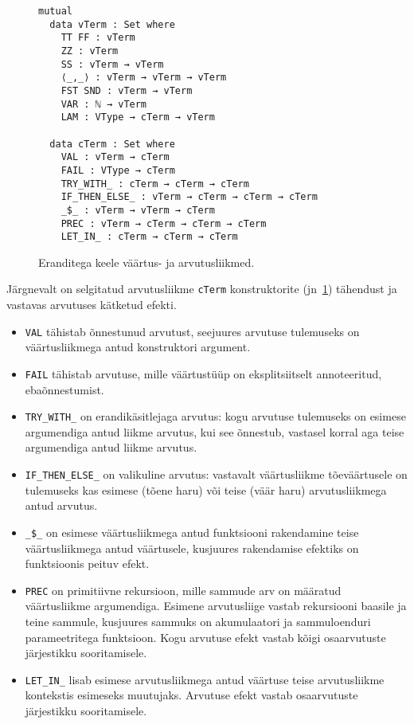 \documentclass[a4paper,12pt]{article}
\begin{document}
\begin{figure}
  \begin{verbatim}
mutual
  data vTerm : Set where
    TT FF : vTerm
    ZZ : vTerm
    SS : vTerm → vTerm
    ⟨_,_⟩ : vTerm → vTerm → vTerm
    FST SND : vTerm → vTerm
    VAR : ℕ → vTerm
    LAM : VType → cTerm → vTerm

  data cTerm : Set where
    VAL : vTerm → cTerm
    FAIL : VType → cTerm
    TRY_WITH_ : cTerm → cTerm → cTerm
    IF_THEN_ELSE_ : vTerm → cTerm → cTerm → cTerm
    _$_ : vTerm → vTerm → cTerm
    PREC : vTerm → cTerm → cTerm → cTerm
    LET_IN_ : cTerm → cTerm → cTerm\end{verbatim}
  \caption{Eranditega keele väärtus- ja arvutusliikmed.}
  \label{fig:exc.raw}
\end{figure}

Järgnevalt on selgitatud arvutusliikme {\tt cTerm} konstruktorite (jn~\ref{fig:exc.raw}) tähendust ja vastavas arvutuses kätketud efekti.
\begin{itemize}
\item {\tt VAL} tähistab õnnestunud arvutust, seejuures arvutuse tulemuseks on väärtusliikmega antud konstruktori argument.
\item {\tt FAIL} tähistab arvutuse, mille väärtustüüp on eksplitsiitselt annoteeritud, ebaõnnestumist.
\item {\tt TRY_WITH_} on erandikäsitlejaga arvutus: kogu arvutuse tulemuseks on esimese argumendiga antud liikme arvutus, kui see õnnestub, vastasel korral aga teise argumendiga antud liikme arvutus.
\item {\tt IF_THEN_ELSE_} on valikuline arvutus: vastavalt väärtusliikme tõeväärtusele on tulemuseks kas esimese (tõene haru) või teise (väär haru) arvutusliikmega antud arvutus.
\item {\tt _\$_} on esimese väärtusliikmega antud funktsiooni rakendamine teise väärtusliikmega antud väärtusele, kusjuures rakendamise efektiks on funktsioonis peituv efekt.
\item {\tt PREC} on primitiivne rekursioon, mille sammude arv on määratud väärtusliikme argumendiga. Esimene arvutusliige vastab rekursiooni baasile ja teine sammule, kusjuures sammuks on akumulaatori ja sammuloenduri parameetritega funktsioon. Kogu arvutuse efekt vastab kõigi osaarvutuste järjestikku sooritamisele.
\item {\tt LET_IN_} lisab esimese arvutusliikmega antud väärtuse teise arvutusliikme kontekstis esimeseks muutujaks. Arvutuse efekt vastab osaarvutuste järjestikku sooritamisele.
\end{itemize}
\end{document}
